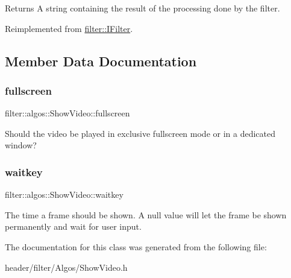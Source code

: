 \begin{DoxyReturn}{Returns}
A string containing the result of the processing done by the filter. 
\end{DoxyReturn}


Reimplemented from \hyperlink{classfilter_1_1_i_filter_ab99902b060a6d9edc3452a8c9f85e37e}{filter\+::\+I\+Filter}.



\subsection{Member Data Documentation}
\mbox{\label{classfilter_1_1algos_1_1_show_video_a68f4e6f1cd76528022ac6b6a5614c64c}} 
\subsubsection{\texorpdfstring{fullscreen}{fullscreen}}
{\footnotesize\ttfamily filter\+::algos\+::\+Show\+Video\+::fullscreen}

Should the video be played in exclusive fullscreen mode or in a dedicated window? \mbox{\label{classfilter_1_1algos_1_1_show_video_ae0d5a03d050969d16b132fb722510a53}} 
\subsubsection{\texorpdfstring{waitkey}{waitkey}}
{\footnotesize\ttfamily filter\+::algos\+::\+Show\+Video\+::waitkey}

The time a frame should be shown. A null value will let the frame be shown permanently and wait for user input. 

The documentation for this class was generated from the following file\+:\begin{DoxyCompactItemize}
\item 
header/filter/\+Algos/Show\+Video.\+h\end{DoxyCompactItemize}
